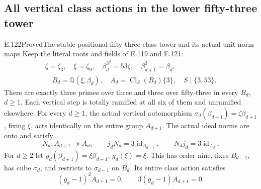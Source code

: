 \subsection{All vertical class actions in the lower fifty-three tower}

\begin{statement}{E.122}{Proved}{The stable positional fifty-three class tower and its actual unit-norm maps}
Keep the literal roots and fields of E.119 and E.121:
\[
 \begin{gathered}
 \zeta=\zeta_3,\quad \xi=\zeta_9,\quad
 \beta_d^{3^d}=53\zeta,\quad\beta_{d+1}^3=\beta_d,\\
 \quad B_d=\mathbb Q(\xi,\beta_d),\quad
 A_d=\operatorname{Cl}_S(B_d)\{3\},\quad S\mid\{3,53\}.
 \end{gathered}
 \tag{E122.1}
\]
There are exactly three primes over three and three over fifty-three
in every $B_d$, $d\ge1$. Each vertical step is totally ramified
at all six of them and unramified elsewhere. For every $d\ge1$,
the actual vertical automorphism
$\sigma_d(\beta_{d+1})=\zeta\beta_{d+1}$, fixing $\xi$,
acts identically on the entire group $A_{d+1}$.
The actual ideal norms are onto and satisfy
\[
 N_d:A_{d+1}\twoheadrightarrow A_d,
 \qquad j_dN_d=3\operatorname{id}_{A_{d+1}},\qquad
 N_dj_d=3\operatorname{id}_{A_d}.
 \tag{E122.2}
\]
For $d\ge2$ let $g_d(\beta_{d+1})=\xi\beta_{d+1}$,
$g_d(\xi)=\xi$. This has order nine, fixes $B_{d-1}$,
has cube $\sigma_d$, and restricts to $\sigma_{d-1}$ on $B_d$.
Its entire class action satisfies
\[
       (g_d-1)^2A_{d+1}=0,
       \qquad 3(g_d-1)A_{d+1}=0.
 \tag{E122.3}
\]


\end{statement}
